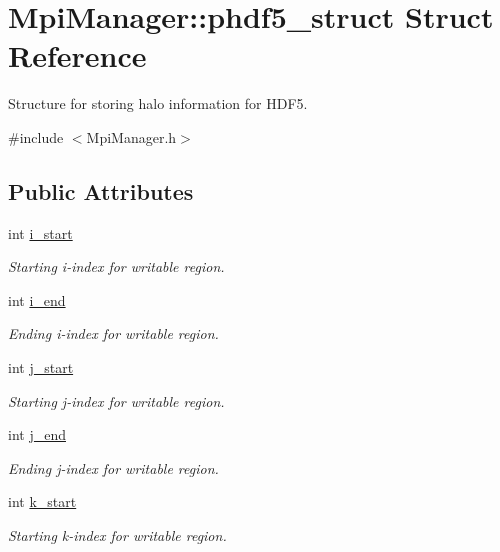 \hypertarget{struct_mpi_manager_1_1phdf5__struct}{}\section{Mpi\+Manager\+:\+:phdf5\+\_\+struct Struct Reference}
\label{struct_mpi_manager_1_1phdf5__struct}


Structure for storing halo information for H\+D\+F5.  




{\ttfamily \#include $<$Mpi\+Manager.\+h$>$}

\subsection*{Public Attributes}
\begin{DoxyCompactItemize}
\item 
int \hyperlink{struct_mpi_manager_1_1phdf5__struct_a971e8f56e0d69005cb639a74250bbb70}{i\+\_\+start}
\begin{DoxyCompactList}\small\item\em Starting i-\/index for writable region. \end{DoxyCompactList}\item 
int \hyperlink{struct_mpi_manager_1_1phdf5__struct_a28567c9488624c7de401c9ee5c5fa13e}{i\+\_\+end}
\begin{DoxyCompactList}\small\item\em Ending i-\/index for writable region. \end{DoxyCompactList}\item 
int \hyperlink{struct_mpi_manager_1_1phdf5__struct_aff0715d84f3e46f8cca3a380add110e3}{j\+\_\+start}
\begin{DoxyCompactList}\small\item\em Starting j-\/index for writable region. \end{DoxyCompactList}\item 
int \hyperlink{struct_mpi_manager_1_1phdf5__struct_ac8869bc50d30230032e13dd5bfe7d1fe}{j\+\_\+end}
\begin{DoxyCompactList}\small\item\em Ending j-\/index for writable region. \end{DoxyCompactList}\item 
int \hyperlink{struct_mpi_manager_1_1phdf5__struct_a94d1c88859049aa2b37c9b659e071760}{k\+\_\+start}
\begin{DoxyCompactList}\small\item\em Starting k-\/index for writable region. \end{DoxyCompactList}\item 

\end{DoxyCompactItemize}
